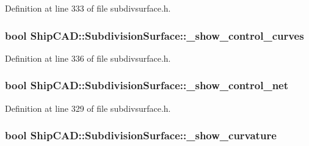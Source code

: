 Definition at line 333 of file subdivsurface.\-h.

\hypertarget{classShipCAD_1_1SubdivisionSurface_ae240b2177e0af0bd1512c94b524f22dd}{
\subsubsection[{\-\_\-show\-\_\-control\-\_\-curves}]{\setlength{\rightskip}{0pt plus 5cm}bool Ship\-C\-A\-D\-::\-Subdivision\-Surface\-::\-\_\-show\-\_\-control\-\_\-curves\hspace{0.3cm}{\ttfamily [protected]}}}\label{classShipCAD_1_1SubdivisionSurface_ae240b2177e0af0bd1512c94b524f22dd}


Definition at line 336 of file subdivsurface.\-h.

\hypertarget{classShipCAD_1_1SubdivisionSurface_ab9bb374cf1368b4a2c779f953bca88a8}{
\subsubsection[{\-\_\-show\-\_\-control\-\_\-net}]{\setlength{\rightskip}{0pt plus 5cm}bool Ship\-C\-A\-D\-::\-Subdivision\-Surface\-::\-\_\-show\-\_\-control\-\_\-net\hspace{0.3cm}{\ttfamily [protected]}}}\label{classShipCAD_1_1SubdivisionSurface_ab9bb374cf1368b4a2c779f953bca88a8}


Definition at line 329 of file subdivsurface.\-h.

\hypertarget{classShipCAD_1_1SubdivisionSurface_abe2167085eac50c986b074635b610462}{
\subsubsection[{\-\_\-show\-\_\-curvature}]{\setlength{\rightskip}{0pt plus 5cm}bool Ship\-C\-A\-D\-::\-Subdivision\-Surface\-::\-\_\-show\-\_\-curvature\hspace{0.3cm}{\ttfamily [protected]}}}\label{classShipCAD_1_1SubdivisionSurface_abe2167085eac50c986b074635b610462}


